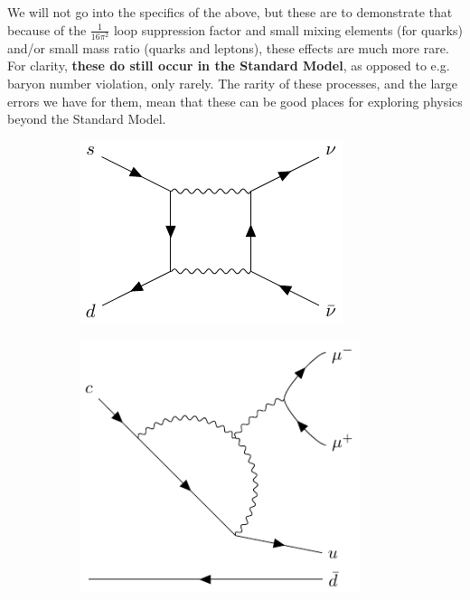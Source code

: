 \documentclass[a4paper, 11pt, normalem]{report}
\begin{document}
We will not go into the specifics of the above, but these are to demonstrate that because of the $\frac{1}{16\pi^2}$ loop suppression factor and small mixing elements (for quarks) and/or small mass ratio (quarks and leptons), these effects are much more rare.
For clarity, \textbf{these do still occur in the Standard Model}, as opposed to e.g. baryon number violation, only rarely.
The rarity of these processes, and the large errors we have for them, mean that these can be good places for exploring physics beyond the Standard Model.
\begin{figure}[H]
    \centering
    \begin{subfigure}[b]{0.3\textwidth}
        \centering
        \includegraphics[width=\textwidth]{fcnc1.pdf}
        \caption{}
    \end{subfigure}
    \begin{subfigure}[b]{0.3\textwidth}
        \centering
        \includegraphics[width=0.9\textwidth]{fcnc2.pdf}

\end{subfigure}
\end{figure}
\end{document}
